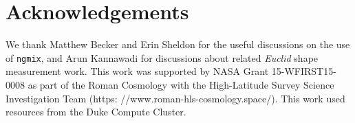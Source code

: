 \documentclass[fleqn,usenatbib]{mnras}
\begin{document}
\section{Acknowledgements}

We thank Matthew Becker and Erin Sheldon for the useful discussions on the use of \texttt{ngmix}, and Arun Kannawadi for discussions about related \emph{Euclid} shape measurement work. This work was supported by NASA Grant 15-WFIRST15-0008 as part of the Roman Cosmology with the High-Latitude Survey Science Investigation Team (https: //www.roman-hls-cosmology.space/). This work used resources from the Duke Compute Cluster.


 











\end{document}
